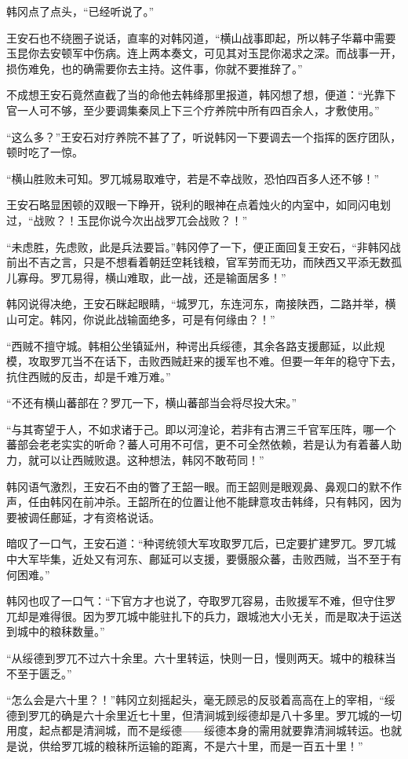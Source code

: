 韩冈点了点头，“已经听说了。”

王安石也不绕圈子说话，直率的对韩冈道，“横山战事即起，所以韩子华幕中需要玉昆你去安顿军中伤病。连上两本奏文，可见其对玉昆你渴求之深。而战事一开，损伤难免，也的确需要你去主持。这件事，你就不要推辞了。”

不成想王安石竟然直截了当的命他去韩绛那里报道，韩冈想了想，便道：“光靠下官一人可不够，至少要调集秦凤上下三个疗养院中所有四百余人，才敷使用。”

“这么多？”王安石对疗养院不甚了了，听说韩冈一下要调去一个指挥的医疗团队，顿时吃了一惊。

“横山胜败未可知。罗兀城易取难守，若是不幸战败，恐怕四百多人还不够！”

王安石略显困顿的双眼一下睁开，锐利的眼神在点着烛火的内室中，如同闪电划过，“战败？！玉昆你说今次出战罗兀会战败？！”

“未虑胜，先虑败，此是兵法要旨。”韩冈停了一下，便正面回复王安石，“非韩冈战前出不吉之言，只是不想看着朝廷空耗钱粮，官军劳而无功，而陕西又平添无数孤儿寡母。罗兀易得，横山难取，此一战，还是输面居多！”

韩冈说得决绝，王安石眯起眼睛，“城罗兀，东连河东，南接陕西，二路并举，横山可定。韩冈，你说此战输面绝多，可是有何缘由？！”

“西贼不擅守城。韩相公坐镇延州，种谔出兵绥德，其余各路支援鄜延，以此规模，攻取罗兀当不在话下，击败西贼赶来的援军也不难。但要一年年的稳守下去，抗住西贼的反击，却是千难万难。”

“不还有横山蕃部在？罗兀一下，横山蕃部当会将尽投大宋。”

“与其寄望于人，不如求诸于己。即以河湟论，若非有古渭三千官军压阵，哪一个蕃部会老老实实的听命？蕃人可用不可信，更不可全然依赖，若是认为有着蕃人助力，就可以让西贼败退。这种想法，韩冈不敢苟同！”

韩冈语气激烈，王安石不由的瞥了王韶一眼。而王韶则是眼观鼻、鼻观口的默不作声，任由韩冈在前冲杀。王韶所在的位置让他不能肆意攻击韩绛，只有韩冈，因为要被调任鄜延，才有资格说话。

暗叹了一口气，王安石道：“种谔统领大军攻取罗兀后，已定要扩建罗兀。罗兀城中大军毕集，近处又有河东、鄜延可以支援，要慑服众蕃，击败西贼，当不至于有何困难。”

韩冈也叹了一口气：“下官方才也说了，夺取罗兀容易，击败援军不难，但守住罗兀却是难得很。因为罗兀城中能驻扎下的兵力，跟城池大小无关，而是取决于运送到城中的粮秣数量。”

“从绥德到罗兀不过六十余里。六十里转运，快则一日，慢则两天。城中的粮秣当不至于匮乏。”

“怎么会是六十里？！”韩冈立刻摇起头，毫无顾忌的反驳着高高在上的宰相，“绥德到罗兀的确是六十余里近七十里，但清涧城到绥德却是八十多里。罗兀城的一切用度，起点都是清涧城，而不是绥德——绥德本身的需用就要靠清涧城转运。也就是说，供给罗兀城的粮秣所运输的距离，不是六十里，而是一百五十里！”


